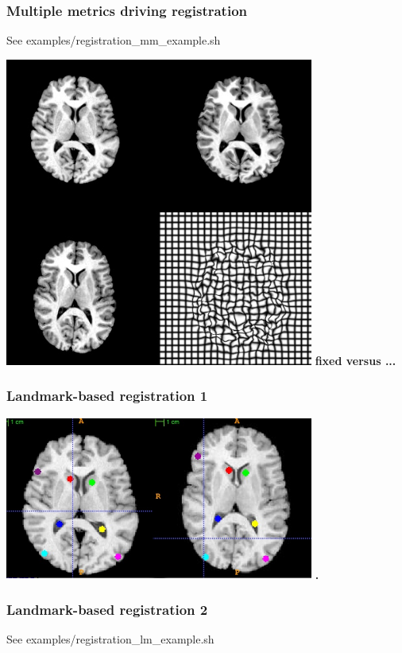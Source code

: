 \documentclass[18pt]{beamer}
\begin{document}
\begin{frame}
\frametitle{Multiple metrics driving registration}
See  examples/registration\_mm\_example.sh

\begin{center}
\includegraphics[width=4in]{../figures/r64registrationmm.jpg}\newline
{\bf fixed versus ... }
\end{center}
\end{frame}


\begin{frame}
\frametitle{Landmark-based registration 1}
\begin{center}
\includegraphics[width=4in]{../figures/landmarks.jpg}\newline
{\bf .}
\end{center}
\end{frame}

\begin{frame}
\frametitle{Landmark-based registration 2}
See  examples/registration\_lm\_example.sh

\end{frame}
\end{document}
